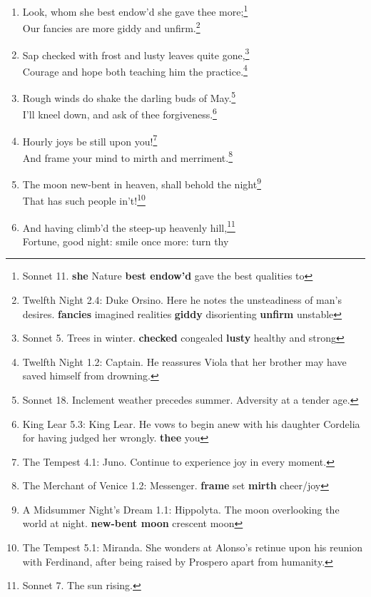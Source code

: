 \documentclass[17pt,twoside]{extarticle}
\begin{document}
\begin{enumerate}
  Now my charms are all o'erthrown,\footnote{The Tempest Epilogue:
    Prospero. \textbf{charms} spells/enchantments \textbf{o'erthrown}
    overthrown = dispelled}\\Begot of nothing but vain
  fantasy.\footnote{Romeo and Juliet 1.4: Mercutio. ``I talk of
    dreams.'' \textbf{begot} brought into existence \textbf{vain}
    useless}
\item
  Look, whom she best endow'd she gave thee more;\footnote{Sonnet 11.
    \textbf{she} Nature \textbf{best endow'd} gave the best qualities to}\\Our
  fancies are more giddy and unfirm.\footnote{Twelfth Night 2.4: Duke
    Orsino. Here he notes the unsteadiness of man's desires.
    \textbf{fancies} imagined realities \textbf{giddy} disorienting
    \textbf{unfirm} unstable}
\item
  Sap checked with frost and lusty leaves quite gone,\footnote{Sonnet 5.
    Trees in winter. \textbf{checked} congealed \textbf{lusty} healthy
    and strong}\\Courage and hope both teaching him the
  practice.\footnote{Twelfth Night 1.2: Captain. He reassures Viola that
    her brother may have saved himself from drowning.}
\item
  Rough winds do shake the darling buds of May.\footnote{Sonnet 18.
    Inclement weather precedes summer. Adversity at a tender age.}\\I'll
  kneel down, and ask of thee forgiveness.\footnote{King Lear 5.3: King
    Lear. He vows to begin anew with his daughter Cordelia for having
    judged her wrongly. \textbf{thee} you}
\item
  Hourly joys be still upon you!\footnote{The Tempest 4.1: Juno.
    Continue to experience joy in every moment.}\\And frame your mind to
  mirth and merriment.\footnote{The Merchant of Venice 1.2: Messenger.
    \textbf{frame} set \textbf{mirth} cheer/joy}
\item
  The moon new-bent in heaven, shall behold the night\footnote{A
    Midsummer Night's Dream 1.1: Hippolyta. The moon overlooking the
    world at night. \textbf{new-bent moon} crescent moon}\\That has such
  people in't!\footnote{The Tempest 5.1: Miranda. She wonders at
    Alonso's retinue upon his reunion with Ferdinand, after being raised
    by Prospero apart from humanity.}
\item
  And having climb'd the steep-up heavenly hill,\footnote{Sonnet 7. The
    sun rising.}\\Fortune, good night: smile once more: turn thy

\end{enumerate}
\end{document}
